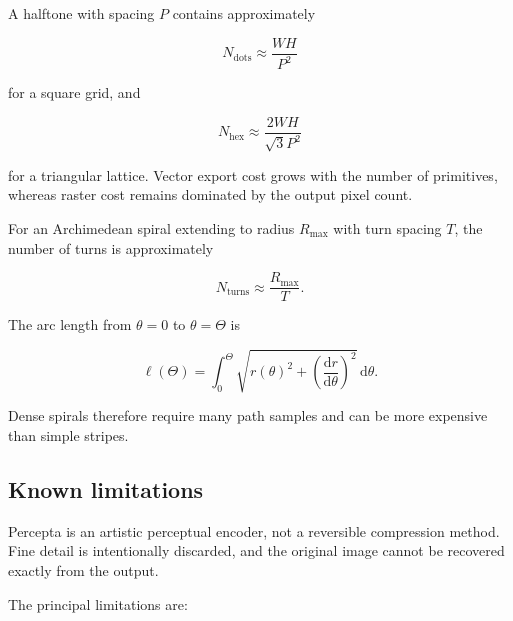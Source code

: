 A halftone with spacing $P$ contains approximately

\begin{equation}
N_{\mathrm{dots}}\approx\frac{WH}{P^2}
\label{eq:dotcount}
\end{equation}

for a square grid, and

\begin{equation}
N_{\mathrm{hex}}\approx
\frac{2WH}{\sqrt{3}P^2}
\label{eq:hexcount}
\end{equation}

for a triangular lattice. Vector export cost grows with the number of primitives, whereas raster cost remains dominated by the output pixel count.

For an Archimedean spiral extending to radius $R_{\max}$ with turn spacing $T$, the number of turns is approximately

\begin{equation}
N_{\mathrm{turns}}\approx\frac{R_{\max}}{T}.
\end{equation}

The arc length from $\theta=0$ to $\theta=\Theta$ is

\begin{equation}
\ell(\Theta)=
\int_0^{\Theta}
\sqrt{r(\theta)^2+\left(\frac{\mathrm{d}r}{\mathrm{d}\theta}\right)^2}
\,\mathrm{d}\theta.
\label{eq:spirallength}
\end{equation}

Dense spirals therefore require many path samples and can be more expensive than simple stripes.

\subsection{Known limitations}

\begin{warningbox}
Percepta is an artistic perceptual encoder, not a reversible compression method. Fine detail is intentionally discarded, and the original image cannot be recovered exactly from the output.
\end{warningbox}

The principal limitations are:


